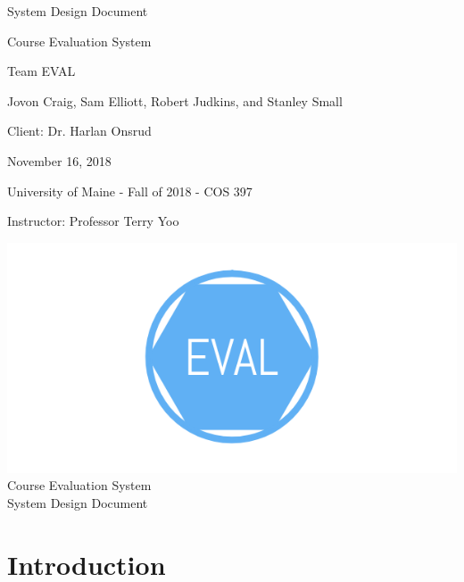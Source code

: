 \documentclass{article}
\begin{document}
\begin{titlepage}


\centering
\vspace*{2cm}
{\Huge System Design Document\par}
\vspace{.25cm}
{\LARGE Course Evaluation System\par}
\vspace{1cm}
{\Large Team EVAL\par}
\vspace{.2cm}
{\Large Jovon Craig, Sam Elliott, Robert Judkins, and Stanley Small\par}
\vspace{1cm}
{\Large Client: Dr. Harlan Onsrud\par}
\vspace{1cm}
{\Large November 16, 2018\par}
\vspace{11cm}

University of Maine - Fall of 2018 - COS 397

Instructor: Professor Terry Yoo

\end{titlepage}

\newpage

\begin{center}
{\includegraphics[scale=.2]{images/team_logo.png}} \\ 	\bigskip
{\LARGE Course Evaluation System } \\ \medskip
{\large System Design Document } \\ \medskip
\end{center}

\tableofcontents

\newpage

\section{Introduction}
\end{document}
